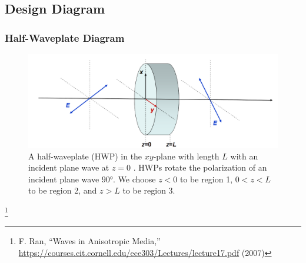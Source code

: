 \documentclass[aspectratio=169,t,xcolor=table]{beamer}
\newcommand\blfootnote[1]{%
  \begingroup
  \renewcommand\thefootnote{}\footnote[frame]{\tiny #1}%
  \addtocounter{footnote}{-1}%
  \endgroup
}
\begin{document}
\subsection{Design Diagram}
\begin{frame}
    \frametitle{Half-Waveplate Diagram}\vspace{-1em}
    \begin{figure}[H]
        \centering
        \includegraphics[width=\textwidth]{figs/HWP.PNG}
        \caption{
            A half-waveplate (HWP) in the $xy$-plane with length $L$ with an incident
            plane wave at $z=0$ \cite{Wav_anis}. HWPs rotate the polarization
            of an incident plane wave $\ang{90}$. We choose $z<0$ to be region 
            1, $0<z<L$ to be region 2, and $z>L$ to be region 3.
        }
        \label{fig:HWP}
    \end{figure}\vspace{-1em}
    \blfootnote{
        \cite{Wav_anis} F. Ran, ``Waves in Anisotropic Media,''
        \url{https://courses.cit.cornell.edu/ece303/Lectures/lecture17.pdf} (2007)
    }
\end{frame}
\end{document}
